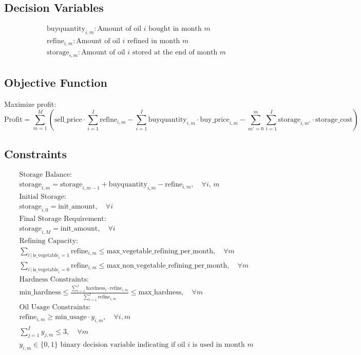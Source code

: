 \documentclass{article}
\begin{document}
\subsection*{Decision Variables}
\begin{align*}
    & \text{buyquantity}_{i,m}: \text{Amount of oil } i \text{ bought in month } m \\
    & \text{refine}_{i,m}: \text{Amount of oil } i \text{ refined in month } m \\
    & \text{storage}_{i,m}: \text{Amount of oil } i \text{ stored at the end of month } m 
\end{align*}

\subsection*{Objective Function}
Maximize profit:
\[
\text{Profit} = \sum_{m=1}^{M} \left( \text{sell\_price} \cdot \sum_{i=1}^{I} \text{refine}_{i,m} - \sum_{i=1}^{I} \text{buyquantity}_{i,m} \cdot \text{buy\_price}_{i,m} - \sum_{m'=0}^{m} \sum_{i=1}^{I} \text{storage}_{i,m'} \cdot \text{storage\_cost} \right)
\]

\subsection*{Constraints}
\begin{align*}
    & \text{Storage Balance:} \\
    & \text{storage}_{i,m} = \text{storage}_{i,m-1} + \text{buyquantity}_{i,m} - \text{refine}_{i,m}, \quad \forall i, \, m \\
    & \text{Initial Storage:} \\
    & \text{storage}_{i,0} = \text{init\_amount}, \quad \forall i \\
    & \text{Final Storage Requirement:} \\
    & \text{storage}_{i,M} = \text{init\_amount}, \quad \forall i \\
    & \text{Refining Capacity:} \\
    & \sum_{i \, | \, \text{is\_vegetable}_{i}=1} \text{refine}_{i,m} \leq \text{max\_vegetable\_refining\_per\_month}, \quad \forall m \\
    & \sum_{i \, | \, \text{is\_vegetable}_{i}=0} \text{refine}_{i,m} \leq \text{max\_non\_vegetable\_refining\_per\_month}, \quad \forall m \\
    & \text{Hardness Constraints:} \\
    & \text{min\_hardness} \leq \frac{\sum_{i=1}^{I} \text{hardness}_{i} \cdot \text{refine}_{i,m}}{\sum_{i=1}^{I} \text{refine}_{i,m}} \leq \text{max\_hardness}, \quad \forall m \\
    & \text{Oil Usage Constraints:} \\
    & \text{refine}_{i,m} \geq \text{min\_usage} \cdot y_{i,m}, \quad \forall i, m \\
    & \sum_{j=1}^{I} y_{j,m} \leq 3, \quad \forall m \\
    & y_{i,m} \in \{0,1\} \text{ binary decision variable indicating if oil } i \text{ is used in month } m
\end{align*}
\end{document}
